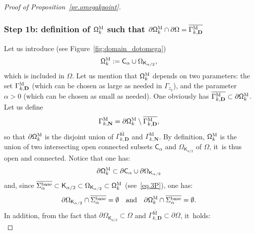 \documentclass[10pt]{amsart}
\newcommand{\quand}{\quad\text{and}\quad}
\newcommand{\mbf}[1]{\mathbf{#1}}
\let\pa\partial
\theoremstyle{plain}
\theoremstyle{definition}
\begin{document}
\begin{proof}[Proof of Proposition~\ref{pr.omegakpoint}]
\subsubsection*{Step 1b: definition of $\mathsf \Omega_k^{\textsc{M}}$ such that $ \pa \mathsf \Omega_k^{\textsc{M}} \cap \partial \Omega =\overline{\Gamma_{k,\mbf D}^{\text{M}}}$}
Let us introduce (see Figure~\ref{fig:domain_dotomega})
\begin{equation}\label{eq.DEFDOTOMEGA}
\mathsf \Omega_k^{\textsc{M}}:= \mathsf C_\alpha \cup\Omega_{\mathsf K_{\alpha/2}},
\end{equation}
which is included in $\Omega$. Let us mention that $ \mathsf
\Omega_k^{\textsc{M}}$ depends on two parameters: the set
$\Gamma_{k,\mbf D}^{\textsc{M}}$ (which can be chosen as large as
needed in $\Gamma_{z_k}$), and the parameter $\alpha>0$ (which can
be chosen as small as needed).
One obviously has $\overline{\Gamma_{k,\mbf D}^{\text{M}}}\subset \pa \mathsf \Omega_k^{\textsc{M}}$.
Let us define
\begin{equation}\label{eq.DEFDOTOMEGA2}
\Gamma_{k,\mbf N}^{\text{M}}= \pa \mathsf \Omega_k^{\textsc{M}}\setminus \overline{\Gamma_{k,\mbf D}^{\text{M}}},
\end{equation}
so that $ \pa \mathsf \Omega_k^{\textsc{M}}$ is the disjoint union of $\overline{\Gamma_{k,\mbf D}^{\text{M}}}$ and $ \Gamma_{k,\mbf N}^{\text{M}}$.
By definition, $\mathsf \Omega_k^{\textsc{M}} $ is the union of two intersecting open connected subsets $\mathsf C_\alpha$ and $\Omega_{\mathsf K_{\alpha/2}}$ of $\Omega$, it~is thus open and connected.
Notice that one has:
\begin{equation}\label{eq.unionboundary1}
\pa \mathsf \Omega_k^{\textsc{M}}\subset \pa \mathsf C_\alpha \cup \partial \Omega_{\mathsf K_{\alpha/2}}
\end{equation}
and, since $\overline{ \Sigma_\alpha^{\textup{base}}}\subset \mathsf K_{\alpha/2} \subset \Omega_{\mathsf K_{\alpha/2}} \subset \mathsf \Omega_{k}^{\textsc{M}}$ (see~\eqref{eq.3P}), one has:
\begin{equation}\label{eq.unionboundary2}
\partial \Omega_{\mathsf K_{\alpha/2}}\cap \overline{ \Sigma_\alpha^{\textup{base}}}=\emptyset \quand \pa \mathsf \Omega_k^{\textsc{M}}\cap \overline{ \Sigma_\alpha^{\textup{base}}}=\emptyset.
\end{equation}
In addition, from the fact that $\partial \Omega_{\mathsf K_{\alpha/2}} \subset \Omega$ and $\overline{\Gamma_{k,\mbf D}^{\text{M}}}\subset \partial \Omega$, it~holds:
\begin{equation}\label{eq.unionboundary3}

\end{equation}
\end{proof}
\end{document}
